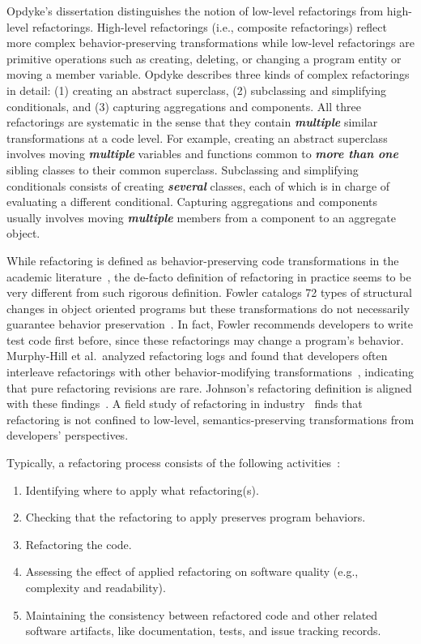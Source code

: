 \documentclass[runningheads,a4paper]{llncs}
\begin{document}
Opdyke's dissertation \cite{Opdyke1992} distinguishes the notion of low-level refactorings from high-level refactorings. High-level refactorings (i.e., composite refactorings) reflect more complex behavior-preserving transformations while low-level refactorings are primitive operations such as creating, deleting, or changing a program entity or moving a member variable. Opdyke describes three kinds of complex refactorings in detail: (1) creating an abstract superclass, (2) subclassing and simplifying conditionals, and (3) capturing aggregations and components. All three refactorings are systematic in the sense that they contain {\bf \em multiple} similar transformations at a code level. For example, {creating an abstract superclass} involves moving {\bf \em multiple} variables and functions common to {\bf \em more than one} sibling classes to their common superclass.  {Subclassing and simplifying conditionals} consists of creating {\bf \em several} classes, each of which is in charge of evaluating a different conditional.  {Capturing aggregations and components} usually involves moving {\bf \em multiple} members from a component to an aggregate object. 

While refactoring is defined as behavior-preserving code transformations in the academic literature~\cite{Mens2004}, the de-facto definition of refactoring in practice seems to be very different from such rigorous definition. Fowler catalogs 72 types of structural changes in object oriented programs but these transformations do not necessarily guarantee behavior preservation~\cite{Fowler2000}. In fact, Fowler recommends developers to write test code first before, since these refactorings may change a program's behavior. Murphy-Hill et al.~analyzed refactoring logs and found that developers often interleave refactorings with other behavior-modifying transformations~\cite{Murphy-Hill2009:refactor}, indicating that pure refactoring revisions are rare. Johnson's refactoring definition is aligned with these findings~\cite{Johnson2011}. A field study of refactoring in industry~\cite{Kim2014:microsoft,Kim2012:fieldrefactoring} finds that refactoring is not confined to low-level, semantics-preserving transformations from developers' perspectives.    




Typically, a refactoring process consists of the following activities~\cite{Mens2004:SSR}:
\begin{enumerate}
\item Identifying where to apply what refactoring(s).
\item Checking that the refactoring to apply preserves program behaviors.
\item Refactoring the code.
\item Assessing the effect of applied refactoring on software quality (e.g., complexity and readability). 
\item Maintaining the consistency between refactored code and other related software artifacts, like documentation, tests, and issue tracking records.  
\end{enumerate}
\end{document}
